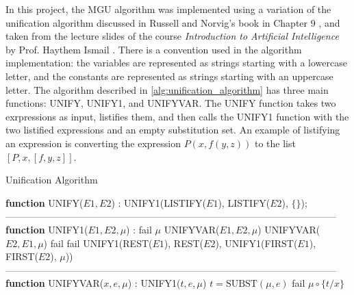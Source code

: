 In this project, the \ac{MGU} algorithm was implemented using a variation of the unification algorithm discussed in Russell and Norvig's book in Chapter 9 \cite{RN2009_Ch.9}, and taken from the lecture slides of the course \textit{Introduction to Artificial Intelligence} by Prof. Haythem Ismail \cite{Ismail2023}.
There is a convention used in the algorithm implementation: the variables are represented as strings starting with a lowercase letter, and the constants are represented as strings starting with an uppercase letter.
The algorithm described in \autoref{alg:unification_algorithm} has three main functions: UNIFY, UNIFY1, and UNIFYVAR. The UNIFY function takes two exrpressions as input, listifies them, and then calls the UNIFY1 function with the two listified expressions and an empty substitution set. An example of listifying an expression is converting the expression $P(x, f(y,z))$ to the list $[P, x, [f, y, z]]$.
\begin{algorithm}[H]
    \caption{Unification Algorithm}
    \begin{algorithmic}[1]
        \label{alg:unification_algorithm}
        \STATE \textbf{function} UNIFY($E1, E2$) :
        \RETURN UNIFY1(LISTIFY($E1$), LISTIFY($E2$), $\{\}$);
        \STATE
        --------------------------------------------------------------------------------------------------------
        \STATE
        \STATE \textbf{function} UNIFY1($E1, E2, \mu$) :
        \RETURN fail
        \ENDIF
        \RETURN $\mu$
        \ENDIF
        \RETURN UNIFYVAR($E1, E2, \mu$)\ENDIF
        \RETURN UNIFYVAR($E2, E1, \mu$)
        \ENDIF
        \RETURN fail
        \ENDIF
        \RETURN fail
        \ENDIF
        \RETURN UNIFY1(REST($E1$), REST($E2$), UNIFY1(FIRST($E1$), FIRST($E2$), $\mu$))
        \STATE
        --------------------------------------------------------------------------------------------------------
        \STATE
        \STATE \textbf{function} UNIFYVAR($x, e, \mu$) :
        \RETURN UNIFY1($t, e, \mu$)
        \ENDIF
        \STATE $t = \text{SUBST}(\mu, e)$
        \RETURN fail
        \ELSE
        \RETURN $\mu \circ \{t/x\}$
        \ENDIF
    \end{algorithmic}
\end{algorithm}
